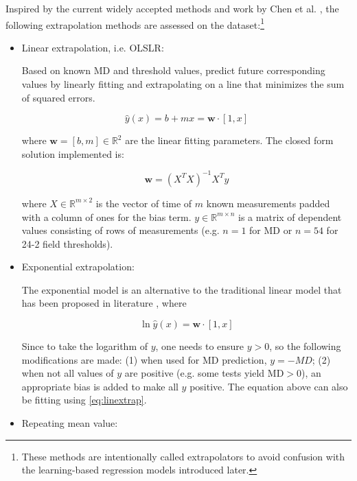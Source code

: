 Inspired by the current widely accepted methods and work by Chen et al. \cite{Chen2014}, the following extrapolation methods are assessed on the dataset:\footnote{These methods are intentionally called extrapolators to avoid confusion with the learning-based regression models introduced later.}

\begin{itemize}
	\item Linear extrapolation, i.e. \acf{OLSLR}: 
	
	Based on known \ac{MD} and threshold values, predict future corresponding values by linearly fitting and extrapolating on a line that minimizes the sum of squared errors. 
	
	\begin{equation}
		\hat{y}(x)=b + mx=\mathbf{w}\cdot[1, x]
	\end{equation}
	
	where $\mathbf{w}=[b, m]\in \mathbb{R}^2$ are the linear fitting parameters. The closed form solution implemented is: 
	
	\begin{equation} \label{eq:linextrap}
		\mathbf{w}=(X^TX)^{-1}X^Ty
	\end{equation}
	
	where $X\in\mathbb{R}^{m\times 2}$ is the vector of time of $m$ known measurements padded with a column of ones for the bias term. $y\in\mathbb{R}^{m\times n}$ is a matrix of dependent values consisting of rows of measurements (e.g. $n=1$ for \ac{MD} or $n=54$ for 24-2 field thresholds).
	
	\item Exponential extrapolation: 
	
	The exponential model is an alternative to the traditional linear model that has been proposed in literature \cite{Chen2014,Pathak2013}, where 
	
	\begin{equation}
		\ln \hat{y}(x)=\mathbf{w}\cdot[1, x]
	\end{equation}
	
	Since to take the logarithm of $y$, one needs to ensure $y>0$, so the following modifications are made: (1) when used for \ac{MD} prediction, $y=-MD$; (2) when not all values of $y$ are positive (e.g. some tests yield \ac{MD}$>0$), an appropriate bias is added to make all $y$ positive. The equation above can also be fitting using \cref{eq:linextrap}.
	
	\item Repeating mean value:
	

\end{itemize}
